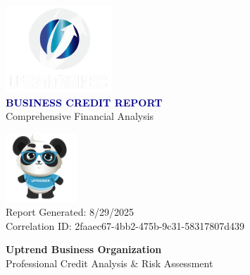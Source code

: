 \documentclass[11pt,a4paper]{article}
\begin{document}
\begin{titlepage}
    \centering
    \vspace*{2cm}
    
    \includegraphics[width=0.3\textwidth]{uptrend_logo.png}\\[1cm]
    
    {\huge\textbf{\textcolor{darkblue}{BUSINESS CREDIT REPORT}}}\\[0.5cm]
    
    {\Large\textcolor{uptrendblue}{Comprehensive Financial Analysis}}\\[2cm]
    
    
    \vspace{2cm}
    
    \includegraphics[width=0.2\textwidth]{uptrend_mascot.png}\\[1cm]
    
    {\large\textcolor{uptrendgray}{Report Generated: 8/29/2025}}\\[0.3cm]
    {\large\textcolor{uptrendgray}{Correlation ID: 2faaec67-4bb2-475b-9c31-58317807d439}}
    
    \vfill
    
    {\textcolor{uptrendblue}{\textbf{Uptrend Business Organization}}}\\
    {\small Professional Credit Analysis \& Risk Assessment}
    
\end{titlepage}
\end{document}
